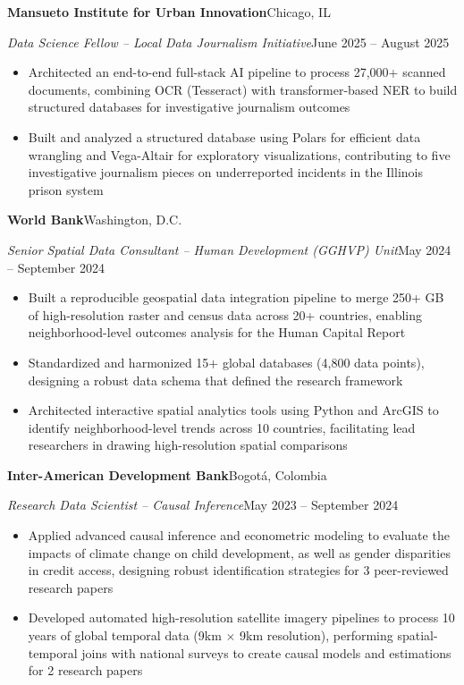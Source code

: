 \documentclass[10pt]{article}
\newcommand{\org}[2]{\noindent\textbf{#1}\hfill #2\par\vspace{0pt}}
\newcommand{\role}[2]{\noindent\textit{#1}\hfill #2\par\vspace{0pt}}
\newenvironment{cvitems}{%
  \begin{itemize}[
    leftmargin=1.2em,
    itemsep=0pt,
    parsep=0pt,
    topsep=1pt,
    label={$\bullet$}]%
}{\end{itemize}}
\newcommand{\entrygap}{\vspace{6pt}}
\begin{document}
\org{Mansueto Institute for Urban Innovation}{Chicago, IL}
\role{Data Science Fellow – Local Data Journalism Initiative}{June 2025 – August 2025}
\vspace{-1pt}
\begin{cvitems}
  \item Architected an end-to-end full-stack AI pipeline to process 27,000+ scanned documents, combining OCR (Tesseract) with transformer-based NER to build structured databases for investigative journalism outcomes
  \item Built and analyzed a structured database using Polars for efficient data wrangling and Vega-Altair for exploratory visualizations, contributing to five investigative journalism pieces on underreported incidents in the Illinois prison system
\end{cvitems}

\entrygap

\org{World Bank}{Washington, D.C.}
\role{Senior Spatial Data Consultant – Human Development (GGHVP) Unit}{May 2024 – September 2024}
\vspace{-1pt}
\begin{cvitems}
  \item Built a reproducible geospatial data integration pipeline to merge 250+ GB of high-resolution raster and census data across 20+ countries, enabling neighborhood-level outcomes analysis for the Human Capital Report
  \item Standardized and harmonized 15+ global databases (4,800 data points), designing a robust data schema that defined the research framework
  \item Architected interactive spatial analytics tools using Python and ArcGIS to identify neighborhood-level trends across 10 countries, facilitating lead researchers in drawing high-resolution spatial comparisons
\end{cvitems}

\entrygap

\org{Inter-American Development Bank}{Bogotá, Colombia}
\role{Research Data Scientist – Causal Inference}{May 2023 – September 2024}
\vspace{-1pt}
\begin{cvitems}
  \item Applied advanced causal inference and econometric modeling to evaluate the impacts of climate change on child development, as well as gender disparities in credit access, designing robust identification strategies for 3 peer-reviewed research papers
  \item Developed automated high-resolution satellite imagery pipelines to process 10 years of global temporal data (9km $\times$ 9km resolution), performing spatial-temporal joins with national surveys to create causal models and estimations for 2 research papers
\end{cvitems}
\end{document}
